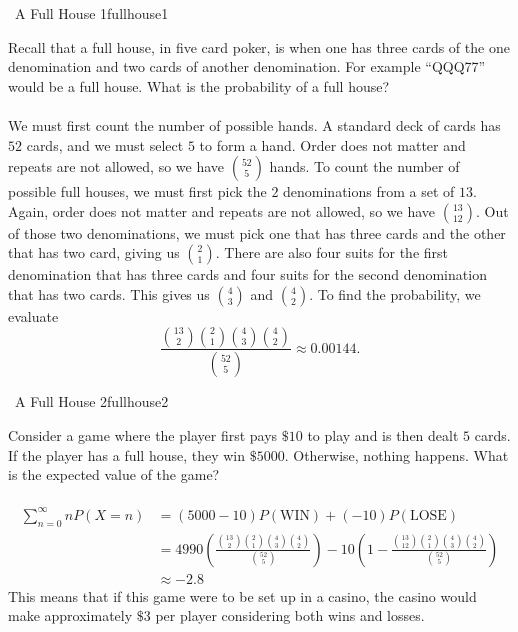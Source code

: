         \pagebreak
        \begin{example}{\Difficulty\,\Difficulty\,\,A Full House 1}{fullhouse1}
        
            Recall that a full house, in five card poker, is when one has three cards of the one denomination and two cards of another denomination. For example ``QQQ77'' would be a full house. What is the probability of a full house?
            \\
            \\
            We must first count the number of possible hands. A standard deck of cards has \(52\) cards, and we must select \(5\) to form a hand. Order does not matter and repeats are not allowed, so we have \(\binom{52}{5}\) hands. To count the number of possible full houses, we must first pick the \(2\) denominations from a set of \(13\). Again, order does not matter and repeats are not allowed, so we have \(\binom{13}{12}\). Out of those two denominations, we must pick one that has three cards and the other that has two card, giving us \(\binom{2}{1}\). There are also four suits for the first denomination that has three cards and four suits for the second denomination that has two cards. This gives us \(\binom{4}{3}\) and \(\binom{4}{2}\). To find the probability, we evaluate
            \begin{equation*}
                \frac{\binom{13}{2}\binom{2}{1}\binom{4}{3}\binom{4}{2}}{\binom{52}{5}}\approx0.00144.
            \end{equation*}
        
        \end{example}
        \begin{example}{\Difficulty\,\Difficulty\,\,A Full House 2}{fullhouse2}
        
            Consider a game where the player first pays \(\$10\) to play and is then dealt \(5\) cards. If the player has a full house, they win \(\$5000\). Otherwise, nothing happens. What is the expected value of the game?
            \\
            \\
            \begin{align*}
                \sum_{n=0}^\infty nP(X=n)&=(5000-10)P(\text{WIN})+(-10)P(\text{LOSE}) \\
                &=4990\left(\frac{\binom{13}{2}\binom{2}{1}\binom{4}{3}\binom{4}{2}}{\binom{52}{5}}\right)-10\left(1-\frac{\binom{13}{12}\binom{2}{1}\binom{4}{3}\binom{4}{2}}{\binom{52}{5}}\right) \\
                &\approx-2.8
            \end{align*}
            This means that if this game were to be set up in a casino, the casino would make approximately \(\$3\) per player considering both wins and losses.
        
        \end{example}
